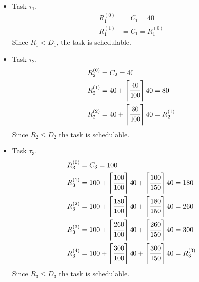     {
        \begin{itemize}
            \item Task $\tau_1$.
            \begin{align*}
                R^{(0)}_1 &= C_1 = 40\\
                R^{(1)}_1 &= C_1 = R^{(0)}_1
            \end{align*}
            Since $R_1 < D_1$, the task is schedulable.
            \item Task $\tau_2$.
            \begin{align*}
                R^{(0)}_2 &= C_2 = 40\\
                R^{(1)}_2 &= 40 + \left\lceil \cfrac{40}{100} \right\rceil40 = 80\\
                R^{(2)}_2 &= 40 + \left\lceil \cfrac{80}{100} \right\rceil40 = R^{(1)}_2
            \end{align*}
            Since $R_2 \le D_2$ the task is schedulable.
            \item Task $\tau_3$.
            \begin{align*}
                R^{(0)}_3 &= C_3 = 100\\
                R^{(1)}_3 &= 100 + \left\lceil \cfrac{100}{100} \right\rceil40 + \left\lceil \cfrac{100}{150} \right\rceil40 = 180\\
                R^{(2)}_3 &= 100 + \left\lceil \cfrac{180}{100} \right\rceil40 + \left\lceil \cfrac{180}{150} \right\rceil40 = 260\\
                R^{(3)}_3 &= 100 + \left\lceil \cfrac{260}{100} \right\rceil40 + \left\lceil \cfrac{260}{150} \right\rceil40 = 300\\
                R^{(4)}_3 &= 100 + \left\lceil \cfrac{300}{100} \right\rceil40 + \left\lceil \cfrac{300}{150} \right\rceil40 = R^{(3)}_3
            \end{align*}
            Since $R_3 \le D_3$ the task is schedulable.
        \end{itemize}
        }